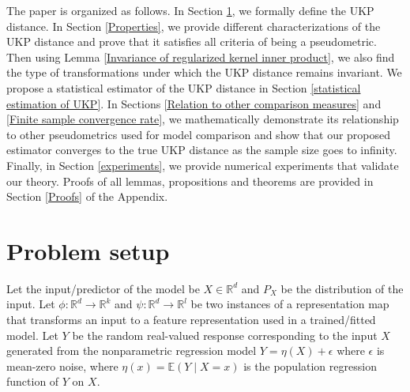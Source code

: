\documentclass{article}
\theoremstyle{plain}
\newcommand{\R}{\mathbb{R}}
\newcommand{\E}{\mathbb{E}}
\newcommand{\repone}{\phi}
\newcommand{\reptwo}{\psi}
\newcommand{\metricstname}{UKP }
\begin{document}
The paper is organized as follows. In Section \ref{Problem Setup}, we formally define the \metricstname distance. In Section \ref{Properties}, we provide different characterizations of the \metricstname distance and prove that it satisfies all criteria of being a pseudometric. Then using Lemma \ref{Invariance of regularized kernel inner product}, we also find the type of transformations under which the \metricstname distance remains invariant. We propose a statistical estimator of the \metricstname distance in Section \ref{statistical estimation of UKP}. In Sections \ref{Relation to other comparison measures} and \ref{Finite sample convergence rate}, we mathematically demonstrate its relationship to other pseudometrics used for model comparison and show that our proposed estimator converges to the true \metricstname distance as the sample size goes to infinity. Finally, in Section \ref{experiments}, we provide numerical experiments that validate our theory. Proofs of all lemmas, propositions and theorems are provided in Section \ref{Proofs} of the Appendix.  

\section{Problem setup}\label{Problem Setup}

Let the input/predictor of the model be $X \in \R^d$ and $P_{X}$ be the distribution of the input. Let $\repone: \R^d \to \R^k$ and $\reptwo: \R^d \to \R^l$ be two instances of a representation map that transforms an input to a feature representation used in a trained/fitted model. Let $Y$ be the random real-valued response corresponding to the input $X$ generated from the nonparametric regression model $Y=\eta(X) + \epsilon$ where $\epsilon$ is mean-zero noise, where $\eta(x) = \E(Y \mid X = x)$ is the population regression function of $Y$ on $X$.
\end{document}
